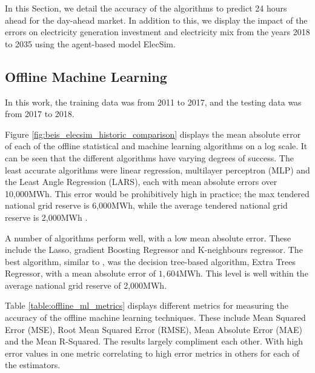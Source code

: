 \documentclass[final,3p,times,twocolumn,numbers]{elsarticle}
\begin{document}
In this Section, we detail the accuracy of the algorithms to predict 24 hours ahead for the day-ahead market. In addition to this, we display the impact of the errors on electricity generation investment and electricity mix from the years 2018 to 2035 using the agent-based model ElecSim.



\subsection{Offline Machine Learning}

In this work, the training data was from 2011 to 2017, and the testing data was from 2017 to 2018.

Figure \ref{fig:beis_elecsim_historic_comparison} displays the mean absolute error of each of the offline statistical and machine learning algorithms on a log scale. It can be seen that the different algorithms have varying degrees of success. The least accurate algorithms were linear regression, multilayer perceptron (MLP) and the Least Angle Regression (LARS), each with mean absolute errors over 10,000MWh. This error would be prohibitively high in practice; the max tendered national grid reserve is 6,000MWh, while the average tendered national grid reserve is 2,000MWh \cite{ESO2019}.



A number of algorithms perform well, with a low mean absolute error. These include the Lasso, gradient Boosting Regressor and K-neighbours regressor. The best algorithm, similar to \cite{Kell2018a}, was the decision tree-based algorithm, Extra Trees Regressor, with a mean absolute error of $1,604$MWh. This level is well within the average national grid reserve of 2,000MWh.

Table \ref{table:offline_ml_metrics} displays different metrics for measuring the accuracy of the offline machine learning techniques. These include Mean Squared Error (MSE), Root Mean Squared Error (RMSE), Mean Absolute Error (MAE) and the Mean R-Squared. The results largely compliment each other. With high error values in one metric correlating to high error metrics in others for each of the estimators.
\end{document}
